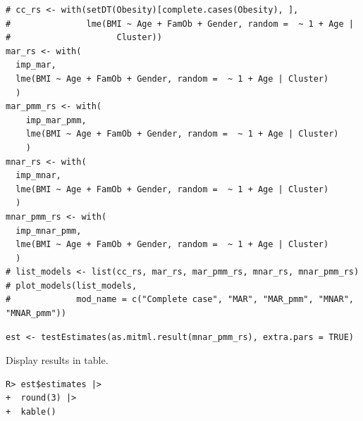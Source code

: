 \documentclass[
  article]{jss}
\begin{document}
\begin{verbatim}
# cc_rs <- with(setDT(Obesity)[complete.cases(Obesity), ],
#               lme(BMI ~ Age + FamOb + Gender, random =  ~ 1 + Age |
#                     Cluster))
mar_rs <- with(
  imp_mar, 
  lme(BMI ~ Age + FamOb + Gender, random =  ~ 1 + Age | Cluster)
  )
mar_pmm_rs <- with(
    imp_mar_pmm,
    lme(BMI ~ Age + FamOb + Gender, random =  ~ 1 + Age | Cluster)
    )
mnar_rs <- with(
  imp_mnar, 
  lme(BMI ~ Age + FamOb + Gender, random =  ~ 1 + Age | Cluster)
  )
mnar_pmm_rs <- with(
  imp_mnar_pmm,
  lme(BMI ~ Age + FamOb + Gender, random =  ~ 1 + Age | Cluster)
  )
# list_models <- list(cc_rs, mar_rs, mar_pmm_rs, mnar_rs, mnar_pmm_rs)
# plot_models(list_models,
#             mod_name = c("Complete case", "MAR", "MAR_pmm", "MNAR", "MNAR_pmm"))
\end{verbatim}

\begin{verbatim}
est <- testEstimates(as.mitml.result(mnar_pmm_rs), extra.pars = TRUE)
\end{verbatim}

Display results in table.

\begin{verbatim}
R> est$estimates |> 
+  round(3) |>
+  kable()
\end{verbatim}
\end{document}
